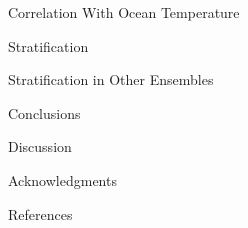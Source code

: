 \message{ !name(presentation.tex)}\documentclass{beamer}
\begin{document}
\begin{frame}{Correlation With Ocean Temperature}

\end{frame}

\begin{frame}{Stratification}

\end{frame}

\begin{frame}{Stratification in Other Ensembles}

\end{frame}

\begin{frame}{Conclusions}

\end{frame}

\begin{frame}{Discussion}

\end{frame}

\begin{frame}{Acknowledgments}

\end{frame}

\begin{frame}{References}
  
  
\end{frame}

\maketitle
\end{document}
